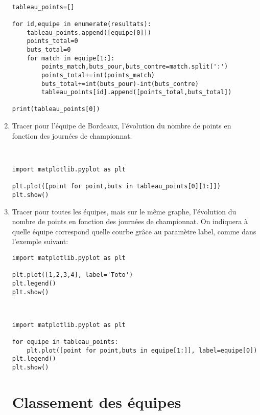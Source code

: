 \begin{enumerate}
\begin{solution}~\ \\
\begin{verbatim}
tableau_points=[]

for id,equipe in enumerate(resultats):
    tableau_points.append([equipe[0]])
    points_total=0
    buts_total=0
    for match in equipe[1:]:
        points_match,buts_pour,buts_contre=match.split(':')
        points_total+=int(points_match)
        buts_total+=int(buts_pour)-int(buts_contre)
        tableau_points[id].append([points_total,buts_total])

print(tableau_points[0])
\end{verbatim}
\end{solution}

\item Tracer pour l'équipe de Bordeaux, l'évolution du nombre de points en fonction des journées de championnat.

\begin{solution}~\ \\
\begin{verbatim}
import matplotlib.pyplot as plt

plt.plot([point for point,buts in tableau_points[0][1:]])
plt.show()
\end{verbatim}
\end{solution}


\item Tracer pour toutes les équipes, mais sur le même graphe, l'évolution du nombre de points en fonction des journées de championnat. On indiquera à quelle équipe correspond quelle courbe grâce au paramètre label, comme dans l'exemple suivant:

\begin{verbatim}
import matplotlib.pyplot as plt

plt.plot([1,2,3,4], label='Toto')
plt.legend()
plt.show()
\end{verbatim}

\begin{solution}~\ \\
\begin{verbatim}
import matplotlib.pyplot as plt

for equipe in tableau_points:
    plt.plot([point for point,buts in equipe[1:]], label=equipe[0])
plt.legend()
plt.show()
\end{verbatim}
\end{solution}

\section*{Classement des équipes}


\end{enumerate}

